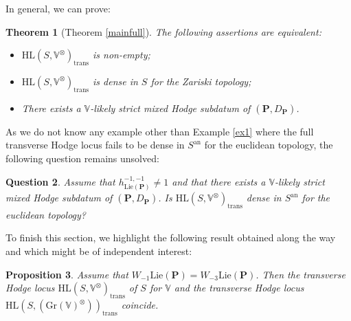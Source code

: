 \documentclass[10pt]{article}
\numberwithin{equation}{subsection}
\theoremstyle{plain}
\newtheorem{theorem}{Theorem}[section]
\newtheorem{proposition}[theorem]{Proposition}
\newtheorem{question}[theorem]{Question}
\theoremstyle{definition}
\theoremstyle{remark}
\newcommand{\lie}{\mathrm{Lie}}
\newcommand{\V}{\mathbb V}
\newcommand{\pp}{\mathbf P}
\newcommand{\HL}{\mathrm{HL}(S, \V^\otimes)}
\newcommand{\an}{\mathrm{an}}
\newcommand{\gr}{\mathrm{Gr}}
\newcommand{\trans}{\mathrm{trans}}
\begin{document}
In general, we can prove:
\begin{theorem}[Theorem \ref{mainfull}]\label{thm2}
The following assertions are equivalent:
\begin{itemize}
\item[(i)] $\HL_\trans$ is non-empty;
\item[(ii)]$\HL_\trans$ is dense in $S$ for the Zariski topology;
\item[(iii)]There exists a $\V$-likely strict mixed Hodge subdatum of $(\pp, D_\pp)$.
\end{itemize}
\end{theorem}
As we do not know any example other than Example \ref{ex1}  where the full transverse Hodge locus fails to be dense in $S^\an$ for the euclidean topology, the following question remains unsolved: %
\begin{question}\label{conjdensan}
Assume that $h_{\lie(\pp)}^{-1,-1} \neq 1$ and that there exists a $\V$-likely strict mixed Hodge subdatum of $(\pp, D_\pp)$. Is $\HL_\trans$ dense in $S^\an$ for the euclidean topology?
\end{question}
To finish this section, we highlight the following result obtained along the way and which might be of independent interest:
\begin{proposition}\label{triv-3}
Assume that $W_{-1} \lie(\pp) = W_{-3} \lie(\pp)$. Then the transverse Hodge locus $\HL_\trans$ of $S$ for $\V$ and the transverse Hodge locus $\mathrm{HL}(S, (\gr(\V)^\otimes))_\trans$ coincide.
\end{proposition}
\end{document}
